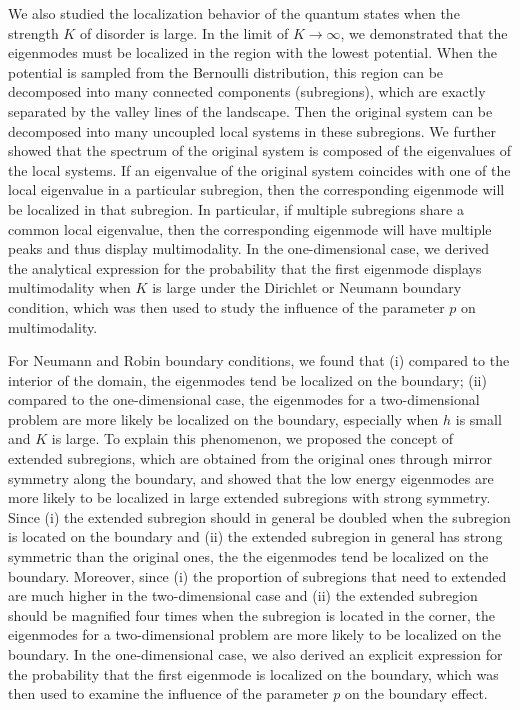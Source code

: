 \documentclass[a4paper,11pt]{article}
\begin{document}
We also studied the localization behavior of the quantum states when the strength $K$ of disorder is large. In the limit of $K\rightarrow\infty$, we demonstrated that the eigenmodes must be localized in the region with the lowest potential. When the potential is sampled from the Bernoulli distribution, this region can be decomposed into many connected components (subregions), which are exactly separated by the valley lines of the landscape. Then the original system can be decomposed into many uncoupled local systems in these subregions. We further showed that the spectrum of the original system is composed of the eigenvalues of the local systems. If an eigenvalue of the original system coincides with one of the local eigenvalue in a particular subregion, then the corresponding eigenmode will be localized in that subregion. In particular, if multiple subregions share a common local eigenvalue, then the corresponding eigenmode will have multiple peaks and thus display multimodality. In the one-dimensional case, we derived the analytical expression for the probability that the first eigenmode displays multimodality when $K$ is large under the Dirichlet or Neumann boundary condition, which was then used to study the influence of the parameter $p$ on multimodality.

For Neumann and Robin boundary conditions, we found that (i) compared to the interior of the domain, the eigenmodes tend be localized on the boundary; (ii) compared to the one-dimensional case, the eigenmodes for a two-dimensional problem are more likely be localized on the boundary, especially when $h$ is small and $K$ is large. To explain this phenomenon, we proposed the concept of extended subregions, which are obtained from the original ones through mirror symmetry along the boundary, and showed that the low energy eigenmodes are more likely to be localized in large extended subregions with strong symmetry. Since (i) the extended subregion should in general be doubled when the subregion is located on the boundary and (ii) the extended subregion in general has strong symmetric than the original ones, the the eigenmodes tend be localized on the boundary. Moreover, since (i) the proportion of subregions that need to extended are much higher in the two-dimensional case and (ii) the extended subregion should be magnified four times when the subregion is located in the corner, the eigenmodes for a two-dimensional problem are more likely to be localized on the boundary. In the one-dimensional case, we also derived an explicit expression for the probability that the first eigenmode is localized on the boundary, which was then used to examine the influence of the parameter $p$ on the boundary effect.
\end{document}
